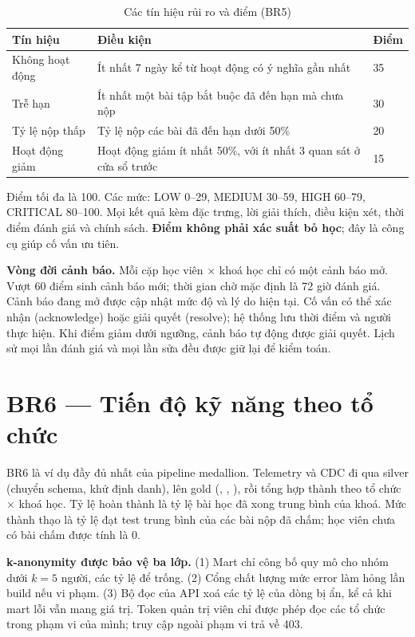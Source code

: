 \begin{table}[H]
\centering\small
\caption{Các tín hiệu rủi ro và điểm (BR5)}\label{tab:br5-signals}
\begin{tabularx}{\textwidth}{@{}L{3.2cm}YL{1.3cm}@{}}
\toprule
\textbf{Tín hiệu} & \textbf{Điều kiện} & \textbf{Điểm} \\
\midrule
Không hoạt động & Ít nhất 7 ngày kể từ hoạt động có ý nghĩa gần nhất & 35 \\
Trễ hạn & Ít nhất một bài tập bắt buộc đã đến hạn mà chưa nộp & 30 \\
Tỷ lệ nộp thấp & Tỷ lệ nộp các bài đã đến hạn dưới 50\% & 20 \\
Hoạt động giảm & Hoạt động giảm ít nhất 50\%, với ít nhất 3 quan sát ở cửa sổ trước & 15 \\
\bottomrule
\end{tabularx}
\end{table}

Điểm tối đa là 100. Các mức: LOW 0--29, MEDIUM 30--59, HIGH 60--79, CRITICAL 80--100. Mọi kết quả kèm đặc trưng, lời giải thích, điều kiện xét, thời điểm đánh giá và chính sách. \textbf{Điểm không phải xác suất bỏ học}; đây là công cụ giúp cố vấn ưu tiên.

\textbf{Vòng đời cảnh báo.} Mỗi cặp học viên × khoá học chỉ có một cảnh báo mở. Vượt 60 điểm sinh cảnh báo mới; thời gian chờ mặc định là 72 giờ đánh giá. Cảnh báo đang mở được cập nhật mức độ và lý do hiện tại. Cố vấn có thể xác nhận (acknowledge) hoặc giải quyết (resolve); hệ thống lưu thời điểm và người thực hiện. Khi điểm giảm dưới ngưỡng, cảnh báo tự động được giải quyết. Lịch sử mọi lần đánh giá và mọi lần sửa đều được giữ lại để kiểm toán.

\section{BR6 --- Tiến độ kỹ năng theo tổ chức}

BR6 là ví dụ đầy đủ nhất của pipeline medallion. Telemetry và CDC đi qua silver (chuyển schema, khử định danh), lên gold (, , ), rồi tổng hợp thành  theo tổ chức × khoá học. Tỷ lệ hoàn thành là tỷ lệ bài học đã xong trung bình của khoá. Mức thành thạo là tỷ lệ đạt test trung bình của các bài nộp đã chấm; học viên chưa có bài chấm được tính là 0.

\textbf{k-anonymity được bảo vệ ba lớp.} (1) Mart chỉ công bố quy mô cho nhóm dưới $k = 5$ người, các tỷ lệ để trống. (2) Cổng chất lượng mức error  làm hỏng lần build nếu vi phạm. (3) Bộ đọc của API xoá các tỷ lệ của dòng bị ẩn, kể cả khi mart lỗi vẫn mang giá trị. Token quản trị viên chỉ được phép đọc các tổ chức trong phạm vi của mình; truy cập ngoài phạm vi trả về 403.

